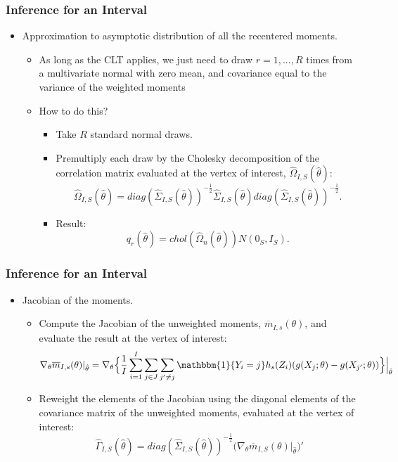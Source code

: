 \documentclass[10pt,letterpaper]{beamer}
\begin{document}
\begin{frame}
\frametitle{Inference for an Interval}

\begin{itemize}
	\item Approximation to asymptotic distribution of all the recentered moments.
	\begin{itemize}
		\item As long as the CLT applies, we just need to draw $r=1,...,R$ times from a multivariate normal with zero mean, and
	covariance equal to the variance of the weighted moments
		\item How to do this?
		\begin{itemize}
			\item Take $R$ standard normal draws.
			\item Premultiply each draw by the Cholesky decomposition of the correlation matrix evaluated at the vertex of interest, $\widehat{\Omega}_{I,S}(\hat{\theta})$:
			\begin{equation*}
			\widehat{\Omega }_{I,S}(\hat{\theta})=diag(\widehat{\Sigma}_{I,S}(\hat{\theta}))^{-\frac{1}{2}}\widehat{\Sigma}_{I,S}(\hat{\theta})diag(\widehat{\Sigma}_{I,S}(\hat{\theta}))^{-\frac{1}{2}}.
			\end{equation*}
			\item Result: 
			\begin{equation*}
			q_{r}(\hat{\theta})=chol(\widehat{\Omega}_{n}(\hat{\theta}))N(0_{S},I_{S}).
			\end{equation*}
		\end{itemize}
	\end{itemize}
\end{itemize}
\end{frame}
\begin{frame}
\frametitle{Inference for an Interval}

\begin{itemize}
	\item Jacobian of the moments.
	\begin{itemize}
		\item Compute the Jacobian of the unweighted moments, $\overline{m}_{I,s}(\theta)$, and evaluate the result at the vertex of interest:
		\begin{equation*}
		\nabla_{\theta}\overline{m}_{I,s}(\theta)|_{\hat{\theta}}=\nabla_{\theta}\Big\{\frac{1}{I}\sum_{i=1}^{I}\sum_{j\in J}\sum_{j'\neq j}\mathbbm{1}\{Y_{i}=j\}h_{s}(Z_{i})(g(X_{j};\theta)-g(X_{j'};\theta))\Big\}\Big|_{\hat{\theta}}
		\end{equation*}
		\item Reweight the elements of the Jacobian using the diagonal elements of the covariance matrix of the unweighted moments, evaluated at the vertex of interest:
		\begin{equation*}
		\widehat{\Gamma}_{I,S}(\hat{\theta})=diag(\widehat{\Sigma}_{I,S}(\hat{\theta}))^{-\frac{1}{2}}\Big(\nabla_{\theta}\overline{m}_{I,S}(\theta)|_{\hat{\theta}}\Big)'
		\end{equation*}
	\end{itemize}
\end{itemize}
\end{frame}
\end{document}
